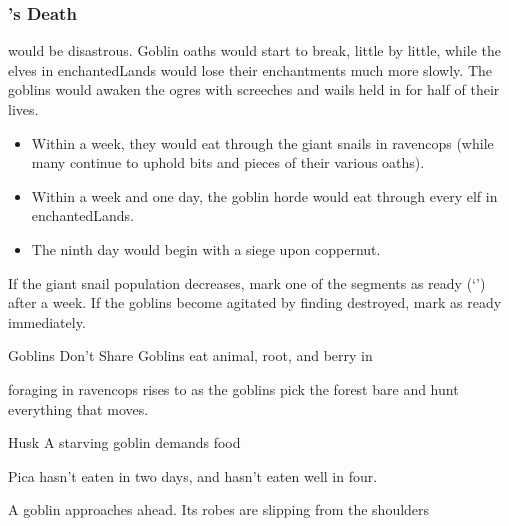 \begin{multicols}{2}
\label{lastOgreSegment}

\stopcontents[segments]

\subsubsection{'s Death}
would be disastrous.
Goblin oaths would start to break, little by little, while the elves in \gls{enchantedLands} would lose their enchantments much more slowly.
The goblins would awaken the \glspl{ogre} with screeches and wails held in for half of their lives.

\index{\expandafter\Glsfmtname{MindElder}'s Death}

\begin{itemize}
  \item
  Within a week, they would eat through the giant snails in \gls{ravencops} (while many continue to uphold bits and pieces of their various oaths).
  \item
  Within a week and one day, the goblin horde would eat through every elf in \gls{enchantedLands}.
  \item
  The ninth day would begin with a siege upon \gls{coppernut}.
\end{itemize}

\vspace{-3em}
\label{goblinsRise}

\renewcommand\enchantedRations{empty bowl}

If the giant snail population decreases, mark one of the \glspl{segment} as ready (`\sgr') after a week.
If the goblins become agitated by finding  destroyed, mark  as ready immediately.

\setcounter{segNo}{-1}
{Goblins Don't Share}%
{Goblins eat animal, root, and berry in }%

\Gls{foraging} in \gls{ravencops} rises to \tn[16] as the goblins pick the forest bare and hunt everything that moves.

{Husk}%
{A starving goblin demands food}%

Pica hasn't eaten in two days, and hasn't eaten well in four.

\begin{boxtext}
  A goblin approaches ahead.
  Its robes are slipping from the shoulders
\end{boxtext}


\end{multicols}
